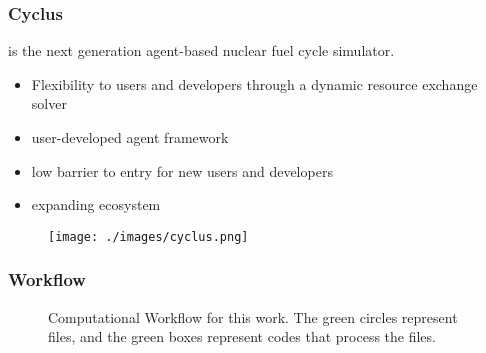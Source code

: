 \begin{frame}
	\frametitle{Cyclus}
	\Cyclus is the next generation agent-based nuclear \cite{huff_fundamental_2016}
	fuel cycle simulator.
	\begin{minipage}[b]{.45\linewidth}
	\begin{itemize}
		\item Flexibility to users and developers through a dynamic resource exchange solver
		\item user-developed agent framework
		\item low barrier to entry for new users and developers
		\item expanding ecosystem
	\end{itemize}
	\end{minipage}
	\hspace{.5cm}
	\begin{minipage}[b]{.45\linewidth}
	\begin{figure}
		\begin{center}
			\texttt{[image: ./images/cyclus.png]}
		\end{center}
	\end{figure}
	\end{minipage}

\end{frame}

\begin{frame}
	\frametitle{Workflow}

\begin{figure}{}
        \centering


\caption{Computational Workflow for this work. The green circles represent files, and the green
         boxes represent codes that process the files.}
\label{diag:comp}
\end{figure}
\end{frame}

